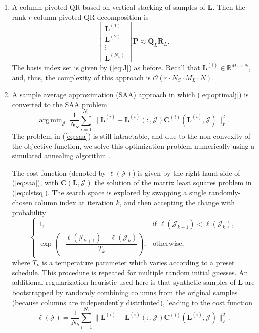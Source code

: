 \documentclass[preprint,10pt]{elsarticle}
\DeclareMathOperator*{\argmin}{arg\,min}
\begin{document}
\begin{enumerate}
    \item A column-pivoted QR based on vertical stacking of samples of $\bm L$. Then the rank-$r$ column-pivoted QR decomposition is
    \begin{equation}
        \begin{bmatrix}
             \bm L^{(1)} \\
             \bm L^{(2)} \\
             \vdots \\ 
             \bm L^{(N_S)}
        \end{bmatrix} \bm P \approx \bm Q_L \bm R_L.
    \end{equation}
    The basis index set is given by (\ref{eq:J}) as before. Recall that $\bm L^{(i)} \in \mathbb{R}^{M_L \times N}$, and, thus, the complexity of this approach is $\mathcal{O} \left(r \cdot N_S \cdot M_L \cdot N \right)$.

\item A sample average approximation (SAA) approach \cite{kleywegt2002sample} in which (\ref{eq:optimalj}) is converted to the SAA problem
\begin{equation}
\label{eq:saa}
     \argmin_{\mathcal{J}} \ \frac{1}{N_S} \sum_{i=1}^{N_S} \| \bm L^{(i)} - \bm L^{(i)}(:, \mathcal{J}) \bm C^{(i)}(\bm L^{(i)}, \mathcal{J}) \|_F^2.
\end{equation}
The problem in (\ref{eq:saa}) is still intractable, and due to the non-convexity of the objective function, we solve this optimization problem numerically using a simulated annealing algorithm \cite{van1987simulated}. 

The cost function (denoted by $\ell(\mathcal{J})$) is given by the right hand side of (\ref{eq:saa}), with $\bm C(\bm L, \mathcal{J})$ the solution of the matrix least squares problem in  (\ref{eq:clstsq}). The search space is explored by swapping a single randomly-chosen column index at iteration $k$, and then accepting the change with probability
%
\[
\begin{cases}
1, & \text{if } \ell(\mathcal{J}_{k+1}) < \ell(\mathcal{J}_{k}),\\[4pt]
\exp\!\left(-\dfrac{\ell(\mathcal{J}_{k+1}) - \ell(\mathcal{J}_{k})}{T_{k}}\right), & \text{otherwise},
\end{cases}
\]
%
where $T_{k}$ is a temperature parameter which varies according to a preset schedule. This procedure is repeated for multiple random initial guesses. An additional regularization heuristic used here is that synthetic samples of $\bm L$ are bootstrapped by randomly combining columns from the original samples (because columns are independently distributed), leading to the cost function
%
\begin{equation}
    \ell(\mathcal{J}) = \frac{1}{N_b} \sum_{i=1}^{N_b} \| \bm L^{(i)} - \bm L^{(i)}(:, \mathcal{J}) \bm C^{(i)}(\bm L^{(i)}, \mathcal{J}) \|_F^2.
\end{equation}


\end{enumerate}
\end{document}
